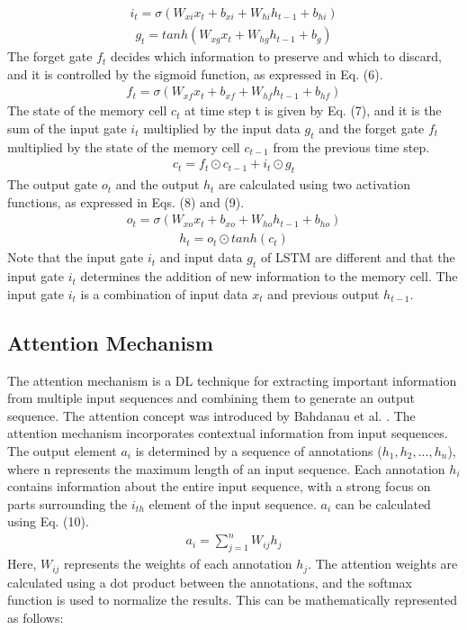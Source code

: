 \documentclass{ieeeaccess}
\begin{document}
\begin{align}
    i_t = \sigma(W_{xi}x_t + b_{xi} + W_{hi}h_{t-1} + b_{hi})
\end{align}
\begin{align}
    g_t = tanh(W_{xg}x_{t} + W_{hg}h_{t-1} + b_g)
\end{align}
The forget gate $f_t$ decides which information to preserve and which to discard, and it is controlled by the sigmoid function, as expressed in Eq. (6).
\begin{align}
    f_t = \sigma(W_{xf}x_t + b_{xf} + W_{hf}h_{t-1} + b_{hf})
\end{align}
The state of the memory cell $c_t$ at time step t is given by Eq. (7), and it is the sum of the input gate $i_t$ multiplied by the input data $g_t$ and the forget gate $f_t$ multiplied by the state of the memory cell $c_{t-1}$ from the previous time step.
\begin{align}
    c_t = f_t \odot c_{t-1} + i_t \odot g_t
\end{align}
The output gate $o_t$ and the output $h_t$ are calculated using two activation functions, as expressed in Eqs. (8) and (9).
\begin{align}
    o_t = \sigma(W_{xo}x_t + b_{xo} + W_{ho}h_{t-1} + b_{ho})
\end{align} 
\begin{align}
    h_t = o_t \odot tanh(c_t)
\end{align}
Note that the input gate $i_t$ and input data $g_t$ of LSTM are different and that the input gate $i_t$ determines the addition of new information to the memory cell. The input gate $i_t$ is a combination of input data $x_t$ and previous output $h_{t-1}$.


\subsection{Attention Mechanism}
The attention mechanism is a DL technique for extracting important information from multiple input sequences and combining them to generate an output sequence. The attention concept was introduced by Bahdanau et al. \cite{Bahdanau_2014}.
The attention mechanism incorporates contextual information from input sequences. The output element $a_i$ is determined by a sequence of annotations ($h_1, h_2, ..., h_n$), where n represents the maximum length of an input sequence. Each annotation $h_i$ contains information about the entire input sequence, with a strong focus on parts surrounding the $i_{th}$ element of the input sequence.
$a_i$ can be calculated using Eq. (10).
\begin{align}
    a_i = \sum_{j=1}^n W_{ij}h_{j}
\end{align}
Here, $W_{ij}$ represents the weights of each annotation $h_{j}$. The attention weights are calculated using a dot product between the annotations, and the softmax function is used to normalize the results. This can be mathematically represented as follows:
\end{document}

